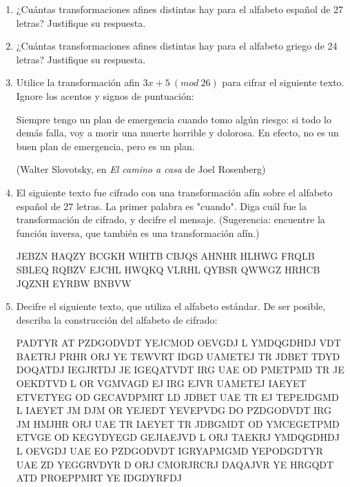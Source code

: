 \documentclass[12pt]{article}
\begin{document}
\begin{enumerate}
\item ¿Cuántas transformaciones afines distintas hay para el alfabeto español de 27 letras? Justifique su respuesta.

\item ¿Cuántas transformaciones afines distintas hay para el alfabeto griego de 24 letras? Justifique su respuesta.

\item Utilice la transformación afin $3x + 5\ (mod\ 26)$ para cifrar el siguiente texto. Ignore los acentos y signos de puntuación:

\begin{addmargin}[1em]{2em} %
Siempre tengo un plan de emergencia cuando  tomo algún riesgo: si todo lo demás falla, voy a morir una muerte horrible
y dolorosa. En efecto, no es un buen plan de emergencia, pero
es un plan.

(Walter Slovotsky, en {\it El camino a casa} de Joel Rosenberg)
\end{addmargin}

\item El siguiente texto fue cifrado con una transformación afín sobre el alfabeto español de 27 letras.
La primer palabra es "cuando". Diga cuál fue la transformación de cifrado, y decifre el mensaje. (Sugerencia: encuentre la función inversa, que también es una transformación afín.)

\begin{addmargin}[1em]{2em} %
JEBZN HAQZY BCGKH WIHTB CBJQS AHNHR HLHWG FRQLB SBLEQ
RQBZV EJCHL HWQKQ VLRHL QYBSR QWWGZ HRHCB JQZNH EYRBW
BNBVW
\end{addmargin}


\item Decifre el siguiente texto, que utiliza el alfabeto estándar. De ser posible, describa la construcción del alfabeto de cifrado:

\begin{addmargin}[1em]{2em} %
PADTYR AT PZDGODVDT YEJCMOD OEVGDJ L YMDQGDHDJ VDT BAETRJ
PRHR ORJ YE TEWVRT IDGD UAMETEJ TR JDBET TDYD DOQATDJ
IEGJRTDJ JE IGEQATVDT IRG UAE OD PMETPMD TR JE OEKDTVD
L OR VGMVAGD EJ IRG EJVR UAMETEJ IAEYET ETVETYEG OD
GECAVDPMRT LD JDBET UAE TR EJ TEPEJDGMD L IAEYET JM
DJM OR YEJEDT YEVEPVDG DO PZDGODVDT IRG JM HMJHR ORJ
UAE TR IAEYET TR JDBGMDT OD YMCEGETPMD ETVGE OD KEGYDYEGD
GEJIAEJVD L ORJ TAEKRJ YMDQGDHDJ L OEVGDJ UAE EO PZDGODVDT
IGRYAPMGMD YEPODGDTYR UAE ZD YEGGRVDYR D ORJ CMORJRCRJ
DAQAJVR YE HRGQDT ATD PROEPPMRT YE IDGDYRFDJ
\end{addmargin}


\end{enumerate}
\end{document}
